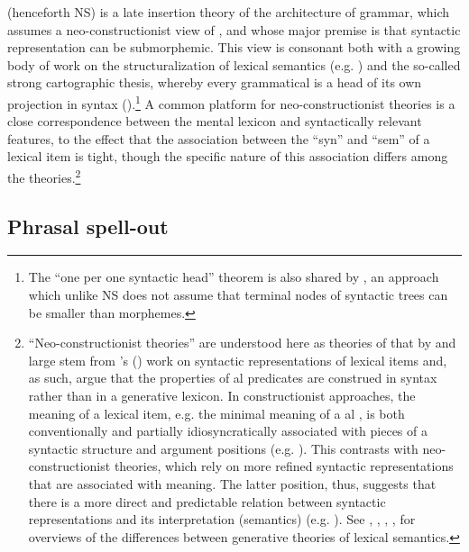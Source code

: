 \begin{sloppypar}
 (henceforth NS) is a late insertion theory of the architecture of grammar, which assumes a neo-constructionist view of , and whose major premise is that syntactic representation can be submorphemic. This view is consonant both with a growing body of work on the structuralization of lexical semantics (e.g. \citealt{Borer2005,Ramchand08}) and the so-called strong cartographic  thesis, whereby every grammatical  is a head of its own projection in syntax (\citealt[50]{CinqueRizzi2008}).\footnote{The ``one  per one syntactic head'' theorem is also shared by \cite{Kayne2005}, an approach which unlike NS does not assume that terminal nodes of syntactic trees can be smaller than morphemes. 
} %
 A common platform for neo-constructionist theories is a close correspondence between the mental lexicon and  syntactically relevant features, to the effect that the association between the ``syn'' and ``sem'' of a lexical item is tight, though the specific nature of this association differs among the theories.\footnote{``Neo-constructionist theories'' are understood here as theories of  that by and large stem from \citeauthor{HK1993}'s (\citeyear{HK1993,HK2002}) work on syntactic representations of lexical items and, as such, argue that the properties of al predicates are construed in syntax rather than in a generative lexicon. 
 In constructionist approaches, the meaning of a lexical item, e.g. the minimal meaning of a al , is both conventionally and partially idiosyncratically associated with pieces of a syntactic structure and argument positions (e.g. \citealt{Goldberg1995,Goldberg2006,Booij2002,Jackendoff2002,Goldberg-Jackendoff2004}). This contrasts with neo-constructionist theories, which rely on more refined syntactic representations that are associated with meaning. The latter position, thus, suggests that there is a more direct and predictable relation between syntactic representations and its interpretation (semantics) (e.g. \citealt{Mateu2002,Borer2003,Borer2005,Ramchand08}).
 See \cite{Levin-Rapp2005}, \citet[19--48]{Acedo2010}, \cite{Ramchand2013}, \cite{Mateu2014}, \cite{Acquaviva-etal-2018} for overviews of the differences between generative theories of lexical semantics.  
} %

\end{sloppypar}

\subsection{Phrasal spell-out}

